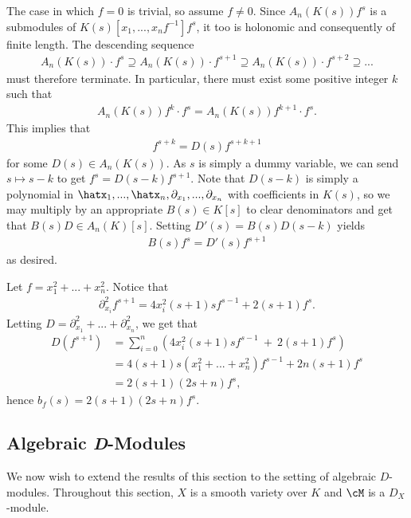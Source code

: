\begin{prf}
	The case in which $f = 0$ is trivial, so assume $f\neq 0$. Since $A_n(K(s))f^s$ is a submodules of $K(s)[x_1,...,x_nf^{-1}]f^s$, it too is holonomic and consequently of finite length. The descending sequence
	\begin{align*}
		A_n(K(s))\cdot f^s \supseteq A_n(K(s))\cdot f^{s+1} \supseteq A_n(K(s))\cdot f^{s+2} \supseteq ...
	\end{align*}
	must therefore terminate. In particular, there must exist some positive integer $k$ such that
	\begin{align*}
		A_n(K(s))f^k\cdot f^s = A_n(K(s))f^{k+1}\cdot f^s.
	\end{align*}
	This implies that
	\begin{align*}
		f^{s+k} = D(s)f^{s+k+1}
	\end{align*}
	for some $D(s) \in A_n(K(s))$. As $s$ is simply a dummy variable, we can send $s\mapsto s - k$ to get $f^s = D(s-k)f^{s+1}$. Note that $D(s-k)$ is simply a polynomial in $\hatx_1,...,\hatx_n,\partial_{x_1},...,\partial_{x_n}$ with coefficients in $K(s)$, so we may multiply by an appropriate $B(s) \in K[s]$ to clear denominators and get that $B(s)D \in A_n(K)[s]$. Setting $D'(s) = B(s)D(s-k)$ yields
	\begin{align*}
		B(s)f^s = D'(s)f^{s+1}
	\end{align*}
	as desired.
\end{prf}
\begin{example}\label{example:explicit-b-function1}
	Let $f = x_1^2+...+x_n^2$. Notice that
	\begin{align*}
		\partial_{x_i}^2 f^{s+1} = 4x_i^2(s+1)sf^{s-1} + 2(s+1)f^s.
	\end{align*}
	Letting $D = \partial_{x_1}^2 + ... + \partial_{x_n}^2$, we get that
	\begin{align*}
		D(f^{s+1})
		  &= \sum_{i=0}^n \left(4x_i^2(s+1)sf^{s-1} ~+~ 2(s+1)f^s\right) \\
		  &= 4(s+1)s(x_1^2+...+x_n^2)f^{s-1} + 2n(s+1)f^s \\
		  &= 2(s+1)(2s+ n)f^s,
	\end{align*}
	hence $b_f(s) = 2(s+1)(2s+n)f^s$.
\end{example}


\subsection{Algebraic \textit{D}-Modules}

We now wish to extend the results of this section to the setting of algebraic $D$-modules. Throughout this section, $X$ is a smooth variety over $K$ and $\cM$ is a $D_X$-module.

